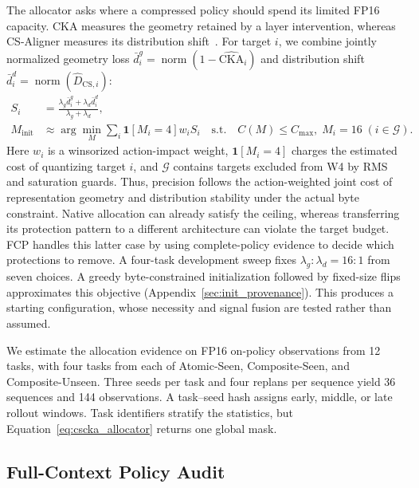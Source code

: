 The allocator asks where a compressed policy should spend its limited FP16 capacity. CKA measures the geometry retained by a layer intervention, whereas CS-Aligner measures its distribution shift~\cite{kornblith2019similarity,yin2026csaligner}. For target $i$, we combine jointly normalized geometry loss $\bar d_i^g=\operatorname{norm}(1-\widehat{\mathrm{CKA}}_i)$ and distribution shift $\bar d_i^d=\operatorname{norm}(\widehat D_{\mathrm{CS},i})$:
\begin{equation}
 \begin{aligned}
 S_i&=\frac{\lambda_g\bar d_i^g+\lambda_d\bar d_i^d}{\lambda_g+\lambda_d},\\
 M_{\mathrm{init}}&\approx\arg\min_{M}\sum_i \mathbf{1}[M_i=4]w_iS_i
 \quad\mathrm{s.t.}\quad C(M)\le C_{\max},\;M_i=16\;(i\in\mathcal G).
 \end{aligned}
 \label{eq:cscka_allocator}
\end{equation}
Here $w_i$ is a winsorized action-impact weight, $\mathbf{1}[M_i=4]$ charges the estimated cost of quantizing target $i$, and $\mathcal G$ contains targets excluded from W4 by RMS and saturation guards. Thus, precision follows the action-weighted joint cost of representation geometry and distribution stability under the actual byte constraint. Native allocation can already satisfy the ceiling, whereas transferring its protection pattern to a different architecture can violate the target budget. FCP handles this latter case by using complete-policy evidence to decide which protections to remove. A four-task development sweep fixes $\lambda_g:\lambda_d=16:1$ from seven choices. A greedy byte-constrained initialization followed by fixed-size flips approximates this objective (Appendix~\ref{sec:init_provenance}). This produces a starting configuration, whose necessity and signal fusion are tested rather than assumed.

We estimate the allocation evidence on FP16 on-policy observations from 12 tasks, with four tasks from each of Atomic-Seen, Composite-Seen, and Composite-Unseen. Three seeds per task and four replans per sequence yield 36 sequences and 144 observations. A task--seed hash assigns early, middle, or late rollout windows. Task identifiers stratify the statistics, but Equation~\ref{eq:cscka_allocator} returns one global mask.

\subsection{Full-Context Policy Audit}
\label{sec:dpac}

